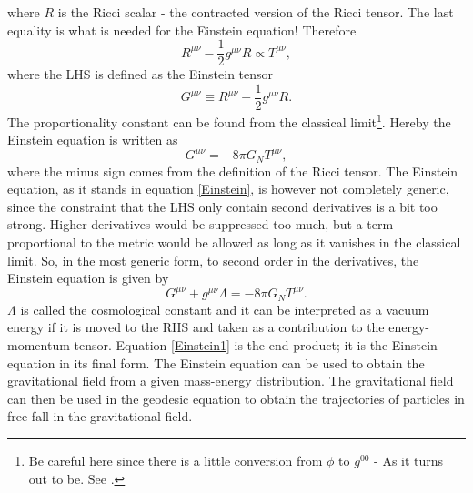 where $R$ is the Ricci scalar - the contracted version of the Ricci tensor. The last equality is what is needed for the Einstein equation! Therefore
\begin{equation}
	R^{\mu\nu}-\frac{1}{2}g^{\mu\nu}R\propto T^{\mu\nu},
\end{equation}  
where the LHS is defined as the Einstein tensor
\begin{equation}
	G^{\mu\nu}\equiv R^{\mu\nu}-\frac{1}{2}g^{\mu\nu}R.
	\label{ein1}
\end{equation} 
The proportionality constant can be found from the classical limit\footnote{Be careful here since there is a little conversion from $\phi$ to $g^{00}$ - As it turns out to be. See \citet{Cheng}.}. Hereby the Einstein equation is written as
\begin{equation}
	G^{\mu\nu}=-8\pi G_NT^{\mu\nu},
	\label{Einstein}
\end{equation} 
where the minus sign comes from the definition of the Ricci tensor. The Einstein equation, as it stands in equation \eqref{Einstein}, is however not completely generic, since the constraint that the LHS only contain second derivatives is a bit too strong. Higher derivatives would be suppressed too much, but a term proportional to the metric would be allowed as long as it vanishes in the classical limit. So, in the most generic form, to second order in the derivatives, the Einstein equation is given by
\begin{equation}
	G^{\mu\nu}+g^{\mu\nu}\Lambda=-8\pi G_NT^{\mu\nu}.
	\label{Einstein1}
\end{equation} 
$\Lambda$ is called the cosmological constant and it can be interpreted as a vacuum energy if it is moved to the RHS and taken as a contribution to the energy-momentum tensor. 
Equation \eqref{Einstein1} is the end product; it is the Einstein equation in its final form. The Einstein equation can be used to obtain the gravitational field from a given mass-energy distribution. The gravitational field can then be used in the geodesic equation to obtain the trajectories of particles in free fall in the gravitational field.  

